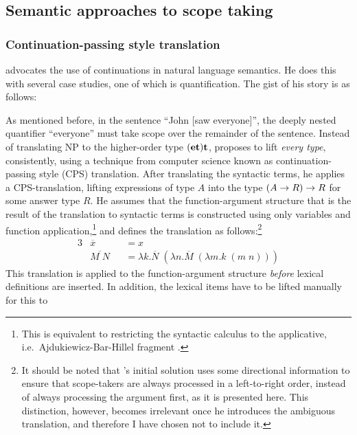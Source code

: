 \subsection{Semantic approaches to scope taking}
\label{sec:continuations-and-scope-taking}



\subsubsection{Continuation-passing style translation}
\citet{barker2002,barker2004} advocates the use of continuations in
natural language semantics. He does this with several case studies,
one of which is quantification. The gist of his story is as follows:

As mentioned before, in the sentence ``John [saw everyone]'', the
deeply nested quantifier ``everyone'' must take scope over the
remainder of the sentence. Instead of translating NP to the higher-order
type $(\mathbf{e}\mathbf{t})\mathbf{t}$, \citeauthor{barker2002} proposes to lift \emph{every
  type}, consistently, using a technique from computer science known
as continuation-passing style (CPS) translation. After translating the
syntactic terms, he applies a CPS-translation, lifting expressions of
type $A$ into the type $(A\rightarrow R)\rightarrow R$ for some answer type $R$. He
assumes that the function-argument structure that is the result of
the translation to syntactic terms is constructed using only variables
and function application,\footnote{%
  This is equivalent to restricting the syntactic calculus to the
  applicative, i.e.\ Ajdukiewicz-Bar-Hillel fragment
  \citep[see][ch.\ 1.1-1.5, AB-grammars]{moot2012}.
}
and defines the translation as follows:\footnote{%
  It should be noted that \citeauthor{barker2004}'s initial solution
  uses some directional information to ensure that scope-takers are
  always processed in a left-to-right order, instead of always
  processing the argument first, as it is presented here.
  This distinction, however, becomes irrelevant once he introduces the
  ambiguous translation, and therefore I have chosen not to include it.
}
\begin{alignat*}{3}
  &\overline{x}    &&= x\\
  &\overline{M\;N} &&= \lambda k. \overline{N}\;(\lambda n.\overline{M}\;(\lambda m.k\;(m\;n)))
\end{alignat*}
This translation is applied to the function-argument structure
\emph{before} lexical definitions are inserted.
In addition, the lexical items have to be lifted manually for this to
